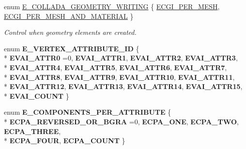 \begin{DoxyCompactItemize}
\item 
enum \hyperlink{namespaceirr_1_1scene_a179008e7c02889459edf81394dbd6959}{E\+\_\+\+C\+O\+L\+L\+A\+D\+A\+\_\+\+G\+E\+O\+M\+E\+T\+R\+Y\+\_\+\+W\+R\+I\+T\+I\+NG} \{ \hyperlink{namespaceirr_1_1scene_a179008e7c02889459edf81394dbd6959a48f7ed09f68367a679cc8f6d4fd63906}{E\+C\+G\+I\+\_\+\+P\+E\+R\+\_\+\+M\+E\+SH}, 
\hyperlink{namespaceirr_1_1scene_a179008e7c02889459edf81394dbd6959af2b6f3248808f3dbf81a7e707e508f65}{E\+C\+G\+I\+\_\+\+P\+E\+R\+\_\+\+M\+E\+S\+H\+\_\+\+A\+N\+D\+\_\+\+M\+A\+T\+E\+R\+I\+AL}
 \}\begin{DoxyCompactList}\small\item\em Control when geometry elements are created. \end{DoxyCompactList}
\item 
enum {\bfseries E\+\_\+\+V\+E\+R\+T\+E\+X\+\_\+\+A\+T\+T\+R\+I\+B\+U\+T\+E\+\_\+\+ID} \{ \\*
{\bfseries E\+V\+A\+I\+\_\+\+A\+T\+T\+R0} =0, 
{\bfseries E\+V\+A\+I\+\_\+\+A\+T\+T\+R1}, 
{\bfseries E\+V\+A\+I\+\_\+\+A\+T\+T\+R2}, 
{\bfseries E\+V\+A\+I\+\_\+\+A\+T\+T\+R3}, 
\\*
{\bfseries E\+V\+A\+I\+\_\+\+A\+T\+T\+R4}, 
{\bfseries E\+V\+A\+I\+\_\+\+A\+T\+T\+R5}, 
{\bfseries E\+V\+A\+I\+\_\+\+A\+T\+T\+R6}, 
{\bfseries E\+V\+A\+I\+\_\+\+A\+T\+T\+R7}, 
\\*
{\bfseries E\+V\+A\+I\+\_\+\+A\+T\+T\+R8}, 
{\bfseries E\+V\+A\+I\+\_\+\+A\+T\+T\+R9}, 
{\bfseries E\+V\+A\+I\+\_\+\+A\+T\+T\+R10}, 
{\bfseries E\+V\+A\+I\+\_\+\+A\+T\+T\+R11}, 
\\*
{\bfseries E\+V\+A\+I\+\_\+\+A\+T\+T\+R12}, 
{\bfseries E\+V\+A\+I\+\_\+\+A\+T\+T\+R13}, 
{\bfseries E\+V\+A\+I\+\_\+\+A\+T\+T\+R14}, 
{\bfseries E\+V\+A\+I\+\_\+\+A\+T\+T\+R15}, 
\\*
{\bfseries E\+V\+A\+I\+\_\+\+C\+O\+U\+NT}
 \}\hypertarget{namespaceirr_1_1scene_a22274bf0c9dc42f754895aee5c995b95}{}\label{namespaceirr_1_1scene_a22274bf0c9dc42f754895aee5c995b95}

\item 
enum {\bfseries E\+\_\+\+C\+O\+M\+P\+O\+N\+E\+N\+T\+S\+\_\+\+P\+E\+R\+\_\+\+A\+T\+T\+R\+I\+B\+U\+TE} \{ \\*
{\bfseries E\+C\+P\+A\+\_\+\+R\+E\+V\+E\+R\+S\+E\+D\+\_\+\+O\+R\+\_\+\+B\+G\+RA} =0, 
{\bfseries E\+C\+P\+A\+\_\+\+O\+NE}, 
{\bfseries E\+C\+P\+A\+\_\+\+T\+WO}, 
{\bfseries E\+C\+P\+A\+\_\+\+T\+H\+R\+EE}, 
\\*
{\bfseries E\+C\+P\+A\+\_\+\+F\+O\+UR}, 
{\bfseries E\+C\+P\+A\+\_\+\+C\+O\+U\+NT}
 \}\hypertarget{namespaceirr_1_1scene_a348d96bb4e4903be62f8978b97042646}{}\label{namespaceirr_1_1scene_a348d96bb4e4903be62f8978b97042646}


\end{DoxyCompactItemize}
